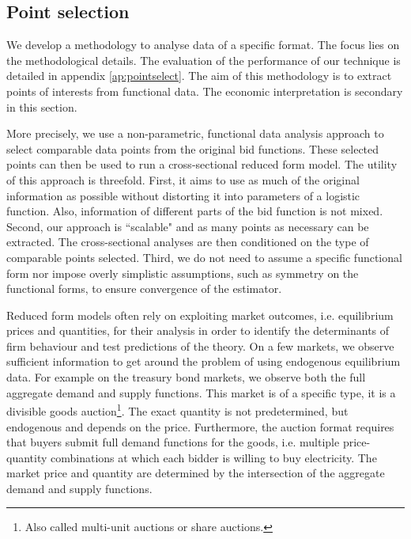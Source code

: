 \subsection{Point selection}
\label{sec:pointselect} 
We develop a methodology to analyse data of a specific format. The focus lies on the methodological details. The evaluation of the performance of our technique is detailed in appendix \ref{ap:pointselect}. The aim of this methodology is to extract points of interests from functional data. The economic interpretation is secondary in this section.  

More precisely, we use a non-parametric, functional data analysis approach to select comparable data points from the original bid functions. These selected points can then be used to run a cross-sectional reduced form model.
The utility of this approach is threefold. First, it aims to use as much of the original information as possible without distorting it into parameters of a logistic function. Also, information of different parts of the bid function is not mixed. Second, our approach is ``scalable" and as many points as necessary can be extracted. The cross-sectional analyses are then conditioned on the type of comparable points selected. Third, we do not need to assume a specific functional form nor impose overly simplistic  assumptions, such as symmetry on the functional forms, to ensure convergence of the estimator. 
 
Reduced form models often rely on exploiting market outcomes, i.e. equilibrium prices and quantities, for their analysis in order to identify the determinants of firm behaviour and test predictions of the theory. %
On a few markets, we observe sufficient information to get around the problem of using endogenous equilibrium data. For example on the treasury bond markets, we observe both the full aggregate demand and supply functions. This market is of a specific type, it is a divisible goods auction\footnote{Also called multi-unit auctions or share auctions.}. The exact quantity is not predetermined, but endogenous and depends on the price. Furthermore, the auction format requires that buyers submit full demand functions for the goods, i.e. multiple price-quantity combinations at which each bidder is willing to buy electricity. The market price and quantity are determined by the intersection of the aggregate demand and supply functions. 

